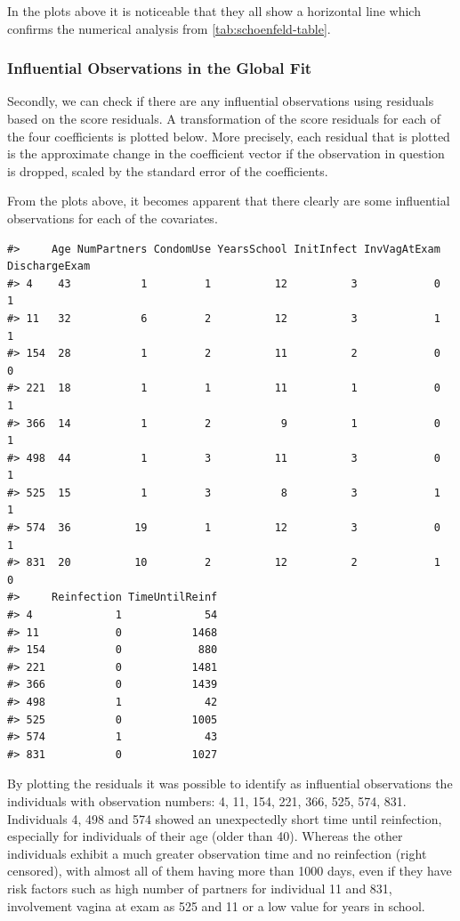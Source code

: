 \documentclass[
]{article}
\begin{document}
In the plots above it is noticeable that they all show a horizontal line which confirms the numerical analysis from \ref{tab:schoenfeld-table}.

\hypertarget{influential-observations-in-the-global-fit}{%
\subsubsection{Influential Observations in the Global Fit}\label{influential-observations-in-the-global-fit}}

Secondly, we can check if there are any influential observations using residuals based on the score residuals. A transformation of the score residuals for each of the four coefficients is plotted below. More precisely, each residual that is plotted is the approximate change in the coefficient vector if the observation in question is dropped, scaled by the standard error of the coefficients.

From the plots above, it becomes apparent that there clearly are some influential observations for each of the covariates.

\begin{verbatim}
#>     Age NumPartners CondomUse YearsSchool InitInfect InvVagAtExam DischargeExam
#> 4    43           1         1          12          3            0             1
#> 11   32           6         2          12          3            1             1
#> 154  28           1         2          11          2            0             0
#> 221  18           1         1          11          1            0             1
#> 366  14           1         2           9          1            0             1
#> 498  44           1         3          11          3            0             1
#> 525  15           1         3           8          3            1             1
#> 574  36          19         1          12          3            0             1
#> 831  20          10         2          12          2            1             0
#>     Reinfection TimeUntilReinf
#> 4             1             54
#> 11            0           1468
#> 154           0            880
#> 221           0           1481
#> 366           0           1439
#> 498           1             42
#> 525           0           1005
#> 574           1             43
#> 831           0           1027
\end{verbatim}

By plotting the residuals it was possible to identify as influential observations the individuals with observation numbers: 4, 11, 154, 221, 366, 525, 574, 831. Individuals 4, 498 and 574 showed an unexpectedly short time until reinfection, especially for individuals of their age (older than 40).
Whereas the other individuals exhibit a much greater observation time and no reinfection (right censored), with almost all of them having more than 1000 days, even if they have risk factors such as high number of partners for individual 11 and 831, involvement vagina at exam as 525 and 11 or a low value for years in school.
\end{document}
